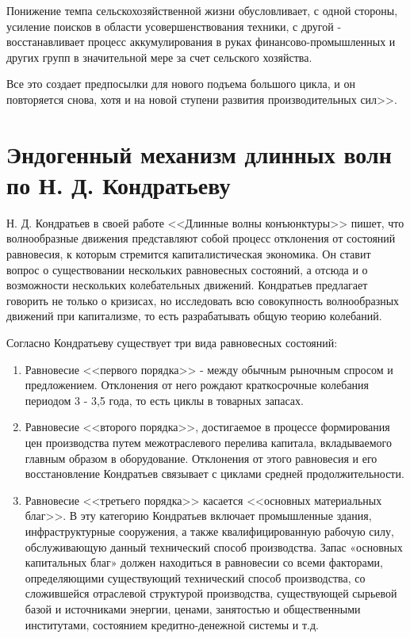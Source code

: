\documentclass[a4paper,14pt]{extarticle}
\begin{document}
 	Понижение темпа сельскохозяйственной жизни обусловливает, с одной стороны, усиление поисков в области усовершенствования техники, с другой - восстанавливает процесс аккумулирования в руках финансово-промышленных и других групп в значительной мере за счет сельского хозяйства.
 	
 	Все это создает предпосылки для нового подъема большого цикла, и он повторяется снова, хотя и на новой ступени развития производительных сил>>.
 	
 	\section{Эндогенный механизм длинных волн по Н. Д. Кондратьеву}
 	
 	
 	Н. Д. Кондратьев в своей работе <<Длинные волны конъюнктуры>> пишет, что волнообразные движения представляют собой процесс отклонения от состояний равновесия, к которым стремится капиталистическая экономика. Он ставит вопрос о существовании нескольких равновесных состояний, а отсюда и о возможности нескольких колебательных движений. Кондратьев предлагает говорить не только о кризисах, но исследовать всю совокупность волнообразных движений при капитализме, то есть разрабатывать общую теорию колебаний.
 	
 	Согласно Кондратьеву существует три вида равновесных состояний:
 	
 	\begin{enumerate}
 		\item Равновесие <<первого порядка>> - между обычным рыночным спросом и предложением. Отклонения от него рождают краткосрочные колебания периодом 3 - 3,5 года, то есть циклы в товарных запасах.
 		\item Равновесие <<второго порядка>>, достигаемое в процессе формирования цен производства путем межотраслевого перелива капитала, вкладываемого главным образом в оборудование. Отклонения от этого равновесия и его восстановление Кондратьев связывает с циклами средней продолжительности.
 		\item Равновесие <<третьего порядка>> касается <<основных материальных благ>>. В эту категорию Кондратьев включает промышленные здания, инфраструктурные сооружения, а также квалифицированную рабочую силу, обслуживающую данный технический способ производства. Запас «основных капитальных благ» должен находиться в равновесии со всеми факторами, определяющими существующий технический способ производства, со сложившейся отраслевой структурой производства, существующей сырьевой базой и источниками энергии, ценами, занятостью и общественными институтами, состоянием кредитно-денежной системы и т.д.
 	\end{enumerate}
 	
\end{document}
